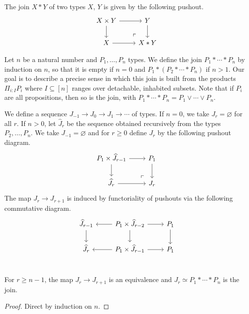 \begin{definition}
The join $X * Y$ of two types $X$, $Y$ is given by the following pushout.
\[
\begin{tikzcd}
X \times Y \arrow[r] \arrow[d]
	& Y \arrow[d] \\
	X \arrow[r] &
	X * Y 
	\arrow[ul, phantom, "\ulcorner" , very near start]
\end{tikzcd}
\]
\end{definition}

Let $n$ be a natural number and $P_1, \ldots, P_n$ types.
We define the join $P_1 * \cdots * P_n$ by induction on $n$,
so that it is empty if $n = 0$ 
and $P_1 * (P_2 * \cdots * P_n)$ if $n > 1$.
Our goal is to describe a precise sense in which
this join is built from the products
$\Pi_{i : I} P_i$ where $I \subseteq [n]$ ranges over detachable,
inhabited subsets.
Note that if $P_i$ are all propositions, then so is the join, with
$P_1 * \cdots * P_n = P_1 \vee \cdots \vee P_n$.

\begin{definition}
We define a sequence $J_{-1} \to J_0 \to J_1 \to \cdots$ of types.
If $n = 0$, we take $J_r = \varnothing$ for all $r$.
If $n > 0$, let $\widehat J_r$ be the sequence obtained recursively from
the types $P_2, \ldots, P_n$.
We take $J_{-1} = \varnothing$ and for $r \ge 0$ define $J_r$ by the following
pushout diagram.
\[
\begin{tikzcd}
P_1 \times \widehat J_{r-1} \arrow[r] \arrow[d]
	& P_1 \arrow[d] \\
	\widehat J_r \arrow[r] &
	J_r 
	\arrow[ul, phantom, "\ulcorner" , very near start]
\end{tikzcd}
\]
The map $J_r \to J_{r+1}$ is induced by functoriality of pushouts via the following
commutative diagram.
\[
\begin{tikzcd}
	\widehat J_{r-1} \arrow[d] &
	P_1 \times \widehat J_{r-2} \arrow[l] \arrow[d] \arrow[r] &
	P_1 \arrow[d] \\
	\widehat J_r &
	P_1 \times \widehat J_{r-1} \arrow[l] \arrow[r] &
	P_1 \\
\end{tikzcd}
\]
\end{definition}

\begin{lemma}
For $r \ge n-1$, the map $J_r \to J_{r+1}$ is an equivalence and
$J_r \simeq P_1 * \cdots * P_n$ is the join.
\end{lemma}
\begin{proof}
Direct by induction on $n$.
\end{proof}

